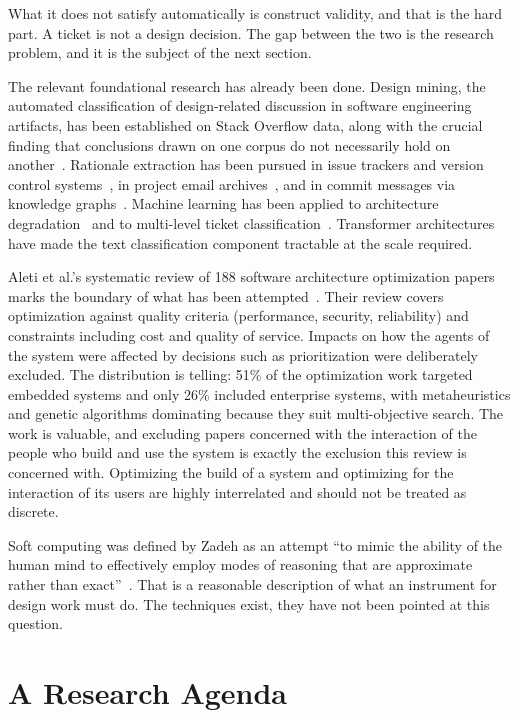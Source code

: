 \documentclass{csimq}
\begin{document}
What it does not satisfy automatically is construct validity, and that is the
hard part. A ticket is not a design decision. The gap between the two is the
research problem, and it is the subject of the next section.

The relevant foundational research has already been done.
Design mining, the automated classification of design-related
discussion in software engineering artifacts, has been established on Stack
Overflow data, along with the crucial finding that conclusions drawn on one
corpus do not necessarily hold on another~\cite{mahadi2021}. Rationale
extraction has been pursued in issue trackers and version control
systems~\cite{kleebaum2021}, in project email archives~\cite{sharma2021}, and
in commit messages via knowledge graphs~\cite{dhaouadi2023}. Machine learning
has been applied to architecture degradation~\cite{herold2020} and to
multi-level ticket classification~\cite{zangari2023}. Transformer
architectures~\cite{devlin2019} have made the text classification component
tractable at the scale required.

Aleti et al.'s systematic review of 188 software architecture optimization
papers marks the boundary of what has been attempted~\cite{aleti2013}. Their
review covers optimization against quality criteria (performance, security,
reliability) and constraints including cost and quality of service. Impacts on
how the agents of the system were affected by decisions such as
prioritization were deliberately excluded. The distribution is telling: 51\% of
the optimization work targeted embedded systems and only 26\% included
enterprise systems, with metaheuristics and genetic algorithms dominating
because they suit multi-objective search. The work is valuable, and excluding
papers concerned with the interaction of the people who build and use the system
is exactly the exclusion this review is concerned with. Optimizing the build of
a system and optimizing for the interaction of its users are highly interrelated
and should not be treated as discrete.

Soft computing was defined by Zadeh as an attempt ``to mimic the ability of the
human mind to effectively employ modes of reasoning that are approximate rather
than exact''~\cite{zadeh1994}. That is a reasonable description of what an
instrument for design work must do. The techniques exist, they have not been
pointed at this question.

\section{A Research Agenda}
\label{sec:agenda}
\end{document}
